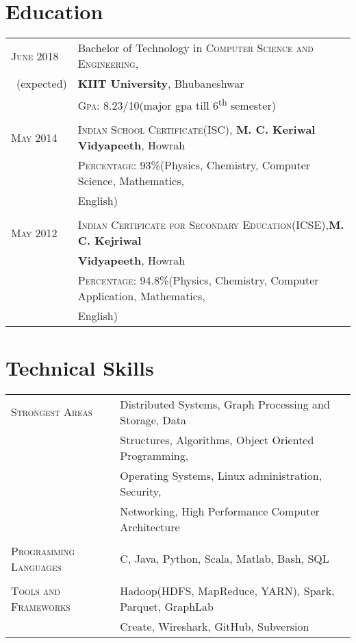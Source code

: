 \documentclass[a4paper,10pt]{article}
\begin{document}
\section{Education}
\begin{tabular}{ll}	
 \textsc{June} 2018& Bachelor of Technology in \textsc{Computer Science and Engineering},\\\ (expected)&\textbf{KIIT University}, Bhubaneshwar\\&\normalsize \textsc{Gpa}: 8.23/10\small(major gpa till 6\textsuperscript{th} semester)\\&
\\ \textsc{May} 2014& \textsc{Indian School Certificate(ISC)}, \normalsize\textbf{M. C. Keriwal Vidyapeeth}, Howrah\\
&\normalsize \textsc{Percentage}: 93\%(Physics, Chemistry, Computer Science, Mathematics, \\&English)\\&
\\ \textsc{May} 2012& \textsc{Indian Certificate for Secondary Education(ICSE)},\textbf{M. C. Kejriwal} \\&\textbf{Vidyapeeth}, Howrah\\&\normalsize \textsc{Percentage}: 94.8\%(Physics, Chemistry, Computer Application, Mathematics, \\&English)
\end{tabular}

\section{Technical Skills}
\begin{tabular}{ll}
\textsc{Strongest Areas} & \normalsize Distributed Systems, Graph Processing and Storage, Data \\
&\normalsize Structures, Algorithms, Object Oriented Programming,\\ &\normalsize  Operating Systems, Linux administration, Security, \\& \normalsize Networking, High Performance Computer Architecture \\&
\\\textsc{Programming Languages} & \normalsize C, Java, Python, Scala, Matlab, Bash, SQL\\&
\\\textsc{Tools and Frameworks} & \normalsize Hadoop(HDFS, MapReduce, YARN), Spark, Parquet, GraphLab \\&\normalsize Create, Wireshark, GitHub, Subversion
\end{tabular}
\end{document}

